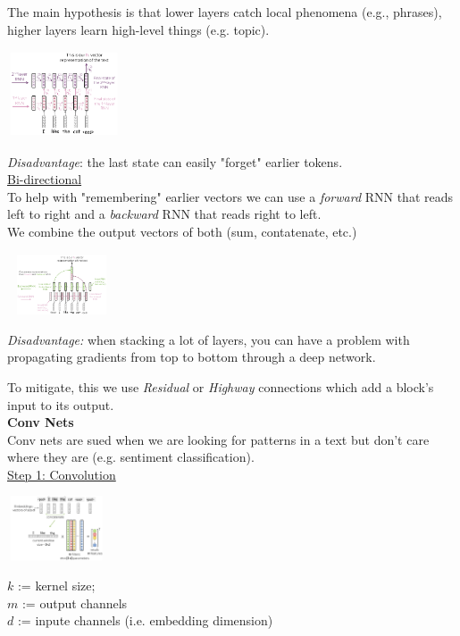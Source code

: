 \documentclass[8pt]{extarticle} %
\begin{document}
\begin{multicols*}{3}
The main hypothesis is that lower layers catch local phenomena (e.g., phrases), higher layers learn high-level things (e.g. topic).
\begin{center}
\includegraphics*[width=0.25\textwidth]{media/multi-layer.png}
\end{center}
\textit{Disadvantage}: the last state can easily "forget" earlier tokens.\\

\underline{Bi-directional}\\

To help with "remembering" earlier vectors we can use a \textit{forward} RNN that reads left to right and a \textit{backward} RNN that reads right to left.\\

We combine the output vectors of both (sum, contatenate, etc.) 
\begin{center}
\includegraphics*[width=0.25\textwidth]{media/bi-directional.png}
\end{center}

\textit{Disadvantage:} when stacking a lot of layers, you can have a problem with
propagating gradients from top to bottom through a deep network.

To mitigate, this we use \textit{Residual} or \textit{Highway} connections which add a block's input to its output.\\

\textbf{Conv Nets}\\
Conv nets are sued when we are looking for patterns in a text but don't care where they are (e.g. sentiment classification).\\

\underline{Step 1: Convolution}\\
\begin{center}
\includegraphics*[width=0.24\textwidth]{media/conv-net1.png}
\end{center}
$k$ := kernel size;\\
$m$ := output channels\\
$d$ := inpute channels (i.e. embedding dimension)\\


\end{multicols*}
\end{document}
